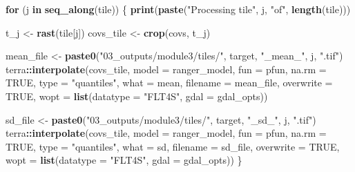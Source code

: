 \documentclass[
  10pt,
  b5paper,
  oneside]{book}
\newenvironment{Shaded}{\begin{snugshade}}{\end{snugshade}}
\newcommand{\AttributeTok}[1]{\textcolor[rgb]{0.13,0.29,0.53}{#1}}
\newcommand{\ConstantTok}[1]{\textcolor[rgb]{0.56,0.35,0.01}{#1}}
\newcommand{\ControlFlowTok}[1]{\textcolor[rgb]{0.13,0.29,0.53}{\textbf{#1}}}
\newcommand{\FunctionTok}[1]{\textcolor[rgb]{0.13,0.29,0.53}{\textbf{#1}}}
\newcommand{\NormalTok}[1]{#1}
\newcommand{\OtherTok}[1]{\textcolor[rgb]{0.56,0.35,0.01}{#1}}
\newcommand{\SpecialCharTok}[1]{\textcolor[rgb]{0.81,0.36,0.00}{\textbf{#1}}}
\newcommand{\StringTok}[1]{\textcolor[rgb]{0.31,0.60,0.02}{#1}}
\begin{document}
\begin{Shaded}
\begin{Highlighting}[]
\ControlFlowTok{for}\NormalTok{ (j }\ControlFlowTok{in} \FunctionTok{seq\_along}\NormalTok{(tile)) \{}
  \FunctionTok{print}\NormalTok{(}\FunctionTok{paste}\NormalTok{(}\StringTok{"Processing tile"}\NormalTok{, j, }\StringTok{"of"}\NormalTok{, }\FunctionTok{length}\NormalTok{(tile)))}

\NormalTok{  t\_j        }\OtherTok{\textless{}{-}} \FunctionTok{rast}\NormalTok{(tile[j])}
\NormalTok{  covs\_tile  }\OtherTok{\textless{}{-}} \FunctionTok{crop}\NormalTok{(covs, t\_j)}

\NormalTok{  mean\_file }\OtherTok{\textless{}{-}} \FunctionTok{paste0}\NormalTok{(}\StringTok{"03\_outputs/module3/tiles/"}\NormalTok{, target, }\StringTok{"\_mean\_"}\NormalTok{, j, }\StringTok{".tif"}\NormalTok{)}
\NormalTok{  terra}\SpecialCharTok{::}\FunctionTok{interpolate}\NormalTok{(covs\_tile, }\AttributeTok{model =}\NormalTok{ ranger\_model, }\AttributeTok{fun =}\NormalTok{ pfun,}
                     \AttributeTok{na.rm =} \ConstantTok{TRUE}\NormalTok{, }\AttributeTok{type =} \StringTok{"quantiles"}\NormalTok{, }\AttributeTok{what =}\NormalTok{ mean,}
                     \AttributeTok{filename =}\NormalTok{ mean\_file, }\AttributeTok{overwrite =} \ConstantTok{TRUE}\NormalTok{,}
                     \AttributeTok{wopt =} \FunctionTok{list}\NormalTok{(}\AttributeTok{datatype =} \StringTok{"FLT4S"}\NormalTok{, }\AttributeTok{gdal =}\NormalTok{ gdal\_opts))}

\NormalTok{  sd\_file }\OtherTok{\textless{}{-}} \FunctionTok{paste0}\NormalTok{(}\StringTok{"03\_outputs/module3/tiles/"}\NormalTok{, target, }\StringTok{"\_sd\_"}\NormalTok{, j, }\StringTok{".tif"}\NormalTok{)}
\NormalTok{  terra}\SpecialCharTok{::}\FunctionTok{interpolate}\NormalTok{(covs\_tile, }\AttributeTok{model =}\NormalTok{ ranger\_model, }\AttributeTok{fun =}\NormalTok{ pfun,}
                     \AttributeTok{na.rm =} \ConstantTok{TRUE}\NormalTok{, }\AttributeTok{type =} \StringTok{"quantiles"}\NormalTok{, }\AttributeTok{what =}\NormalTok{ sd,}
                     \AttributeTok{filename =}\NormalTok{ sd\_file, }\AttributeTok{overwrite =} \ConstantTok{TRUE}\NormalTok{,}
                     \AttributeTok{wopt =} \FunctionTok{list}\NormalTok{(}\AttributeTok{datatype =} \StringTok{"FLT4S"}\NormalTok{, }\AttributeTok{gdal =}\NormalTok{ gdal\_opts))}
\NormalTok{\}}
\end{Highlighting}
\end{Shaded}
\end{document}
